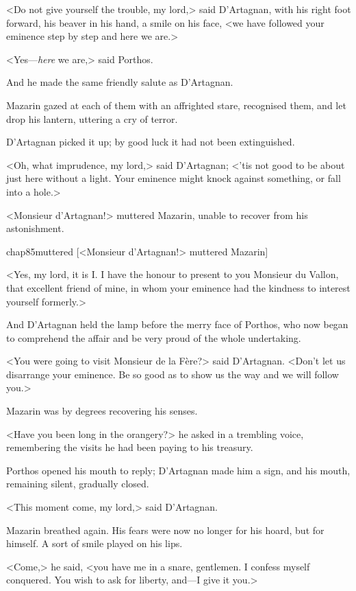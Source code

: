 <Do not give yourself the trouble, my lord,> said D'Artagnan, with his right foot forward, his beaver in his hand, a smile on his face, <we have followed your eminence step by step and here we are.>

<Yes—\emph{here} we are,> said Porthos.

And he made the same friendly salute as D'Artagnan.

Mazarin gazed at each of them with an affrighted stare, recognised them, and let drop his lantern, uttering a cry of terror.

D'Artagnan picked it up; by good luck it had not been extinguished.

<Oh, what imprudence, my lord,> said D'Artagnan; <'tis not good to be about just here without a light. Your eminence might knock against something, or fall into a hole.>

<Monsieur d'Artagnan!> muttered Mazarin, unable to recover from his astonishment.

\begin{bwbigpic}
	[\basicscale] 
	{chap85muttered}
	[<Monsieur d'Artagnan!> muttered Mazarin]
\end{bwbigpic}


<Yes, my lord, it is I. I have the honour to present to you Monsieur du Vallon, that excellent friend of mine, in whom your eminence had the kindness to interest yourself formerly.>

And D'Artagnan held the lamp before the merry face of Porthos, who now began to comprehend the affair and be very proud of the whole undertaking.

<You were going to visit Monsieur de la Fère?> said D'Artagnan. <Don't let us disarrange your eminence. Be so good as to show us the way and we will follow you.>

Mazarin was by degrees recovering his senses.

<Have you been long in the orangery?> he asked in a trembling voice, remembering the visits he had been paying to his treasury.

Porthos opened his mouth to reply; D'Artagnan made him a sign, and his mouth, remaining silent, gradually closed.

<This moment come, my lord,> said D'Artagnan.

Mazarin breathed again. His fears were now no longer for his hoard, but for himself. A sort of smile played on his lips.

<Come,> he said, <you have me in a snare, gentlemen. I confess myself conquered. You wish to ask for liberty, and—I give it you.>

